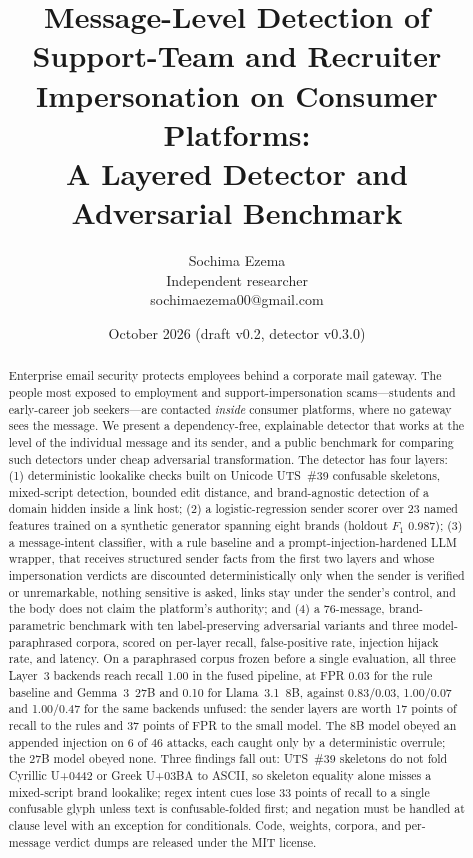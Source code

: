 \documentclass[10pt,twocolumn]{article}
\title{Message-Level Detection of Support-Team and Recruiter Impersonation on Consumer Platforms:\\ A Layered Detector and Adversarial Benchmark}
\author{Sochima Ezema\\ Independent researcher\\ sochimaezema00@gmail.com}
\date{October 2026 \quad(draft v0.2, detector v0.3.0)}
\newcommand{\cp}[1]{\mbox{U+#1}}
\begin{document}
\maketitle

\begin{abstract}
Enterprise email security protects employees behind a corporate mail gateway. The people most exposed to employment and support-impersonation scams---students and early-career job seekers---are contacted \emph{inside} consumer platforms, where no gateway sees the message. We present a dependency-free, explainable detector that works at the level of the individual message and its sender, and a public benchmark for comparing such detectors under cheap adversarial transformation. The detector has four layers: (1) deterministic lookalike checks built on Unicode UTS~\#39 confusable skeletons, mixed-script detection, bounded edit distance, and brand-agnostic detection of a domain hidden inside a link host; (2) a logistic-regression sender scorer over 23 named features trained on a synthetic generator spanning eight brands (holdout $F_1$ 0.987); (3) a message-intent classifier, with a rule baseline and a prompt-injection-hardened LLM wrapper, that receives structured sender facts from the first two layers and whose impersonation verdicts are discounted deterministically only when the sender is verified or unremarkable, nothing sensitive is asked, links stay under the sender's control, and the body does not claim the platform's authority; and (4) a 76-message, brand-parametric benchmark with ten label-preserving adversarial variants and three model-paraphrased corpora, scored on per-layer recall, false-positive rate, injection hijack rate, and latency. On a paraphrased corpus frozen before a single evaluation, all three Layer~3 backends reach recall 1.00 in the fused pipeline, at FPR 0.03 for the rule baseline and Gemma~3~27B and 0.10 for Llama~3.1~8B, against 0.83/0.03, 1.00/0.07 and 1.00/0.47 for the same backends unfused: the sender layers are worth 17 points of recall to the rules and 37 points of FPR to the small model. The 8B model obeyed an appended injection on 6 of 46 attacks, each caught only by a deterministic overrule; the 27B model obeyed none. Three findings fall out: UTS~\#39 skeletons do not fold Cyrillic \cp{0442} or Greek \cp{03BA} to ASCII, so skeleton equality alone misses a mixed-script brand lookalike; regex intent cues lose 33 points of recall to a single confusable glyph unless text is confusable-folded first; and negation must be handled at clause level with an exception for conditionals. Code, weights, corpora, and per-message verdict dumps are released under the MIT license.
\end{abstract}
\end{document}
